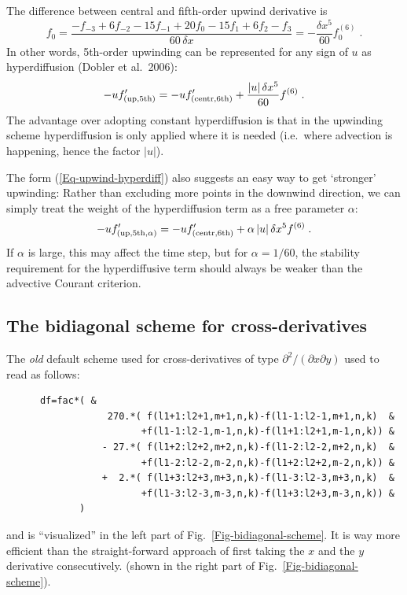 \documentclass[\mydriver,12pt,twoside,notitlepage,a4paper]{article}
\begin{document}
The difference between central and fifth-order upwind derivative is
\begin{equation}
  [D^{\rm(up,5)} - D^{\rm(cent,6)}] f_0
  = \frac{-f_{-3} + 6 f_{-2} - 15 f_{-1} + 20 f_{0}
          - 15 f_{1} + 6 f_{2} - f_{3}}
         {60\,\delta x}
  = -\frac{\delta x^5}{60} f^{(6)}_{0} \; .
\end{equation}
In other words, 5th-order upwinding can be represented for any sign of $u$
as hyperdiffusion (Dobler et al.\ 2006): 
\begin{equation} \label{Eq-upwind-hyperdiff}
  -u f'_{\rm(up,5th)}
  = -u f'_{\rm(centr,6th)}  + \frac{|u|\,\delta x^5}{60} f^{(6)} \; .
\end{equation}
The advantage over adopting constant hyperdiffusion is that in the
upwinding scheme hyperdiffusion is only applied where it is needed
(i.e.~where advection is happening, hence the factor $|u|$).

The form (\ref{Eq-upwind-hyperdiff}) also suggests an easy way to get
`stronger' upwinding: Rather than excluding more points in the downwind
direction, we can simply treat the weight of the hyperdiffusion term as a
free parameter $\alpha$:
\begin{equation}
  -u f'_{\rm(up,5th,\alpha)}
  = -u f'_{\rm(centr,6th)}  + \alpha\,|u|\,\delta x^5 f^{(6)} \; .
\end{equation}
If $\alpha$ is large, this may affect the time step, but for
$\alpha=1/60$, the stability requirement for the hyperdiffusive term
should always be weaker than the advective Courant criterion.

\subsection{The bidiagonal scheme for cross-derivatives}
\label{Bidiagonal}

The {\em old} default scheme used for cross-derivatives of type
$\partial^2/(\partial x \partial y)$ used to read as follows:
\begin{verbatim}
      df=fac*( &
                  270.*( f(l1+1:l2+1,m+1,n,k)-f(l1-1:l2-1,m+1,n,k)  &
                        +f(l1-1:l2-1,m-1,n,k)-f(l1+1:l2+1,m-1,n,k)) &
                 - 27.*( f(l1+2:l2+2,m+2,n,k)-f(l1-2:l2-2,m+2,n,k)  &
                        +f(l1-2:l2-2,m-2,n,k)-f(l1+2:l2+2,m-2,n,k)) &
                 +  2.*( f(l1+3:l2+3,m+3,n,k)-f(l1-3:l2-3,m+3,n,k)  &
                        +f(l1-3:l2-3,m-3,n,k)-f(l1+3:l2+3,m-3,n,k)) &
             )
\end{verbatim}
and is ``visualized'' in the left part of Fig.~\ref{Fig-bidiagonal-scheme}.
It is way more efficient than the straight-forward approach of first
taking the $x$ and the $y$ derivative consecutively.
(shown in the right part of Fig.~\ref{Fig-bidiagonal-scheme}).
\end{document}
